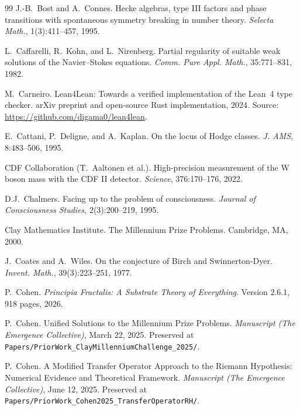 \documentclass[11pt,a4paper]{amsart}
\theoremstyle{plain}
\theoremstyle{definition}
\begin{document}
\begin{thebibliography}{99}
J.-B.~Bost and A.~Connes.
\newblock Hecke algebras, type III factors and phase transitions with spontaneous symmetry breaking in number theory.
\newblock \emph{Selecta Math.}, 1(3):411--457, 1995.

L.~Caffarelli, R.~Kohn, and L.~Nirenberg.
\newblock Partial regularity of suitable weak solutions of the Navier--Stokes equations.
\newblock \emph{Comm. Pure Appl. Math.}, 35:771--831, 1982.

M.~Carneiro.
\newblock Lean4Lean: Towards a verified implementation of the Lean~4 type checker.
\newblock arXiv preprint and open-source Rust implementation, 2024. Source: \url{https://github.com/digama0/lean4lean}.

E.~Cattani, P.~Deligne, and A.~Kaplan.
\newblock On the locus of Hodge classes.
\newblock \emph{J. AMS}, 8:483--506, 1995.

CDF Collaboration (T.~Aaltonen et al.).
\newblock High-precision measurement of the W boson mass with the CDF II detector.
\newblock \emph{Science}, 376:170--176, 2022.

D.J.~Chalmers.
\newblock Facing up to the problem of consciousness.
\newblock \emph{Journal of Consciousness Studies}, 2(3):200--219, 1995.

Clay Mathematics Institute.
\newblock The Millennium Prize Problems.
\newblock Cambridge, MA, 2000.

J.~Coates and A.~Wiles.
\newblock On the conjecture of Birch and Swinnerton-Dyer.
\newblock \emph{Invent. Math.}, 39(3):223--251, 1977.

P.~Cohen.
\newblock \emph{Principia Fractalis: A Substrate Theory of Everything}.
\newblock Version 2.6.1, 918 pages, 2026.

P.~Cohen.
\newblock Unified Solutions to the Millennium Prize Problems.
\newblock \emph{Manuscript (The Emergence Collective)}, March 22, 2025. Preserved at \texttt{Papers/PriorWork\_ClayMillenniumChallenge\_2025/}.

P.~Cohen.
\newblock A Modified Transfer Operator Approach to the Riemann Hypothesis: Numerical Evidence and Theoretical Framework.
\newblock \emph{Manuscript (The Emergence Collective)}, June 12, 2025. Preserved at \texttt{Papers/PriorWork\_Cohen2025\_TransferOperatorRH/}.


\end{thebibliography}
\end{document}
